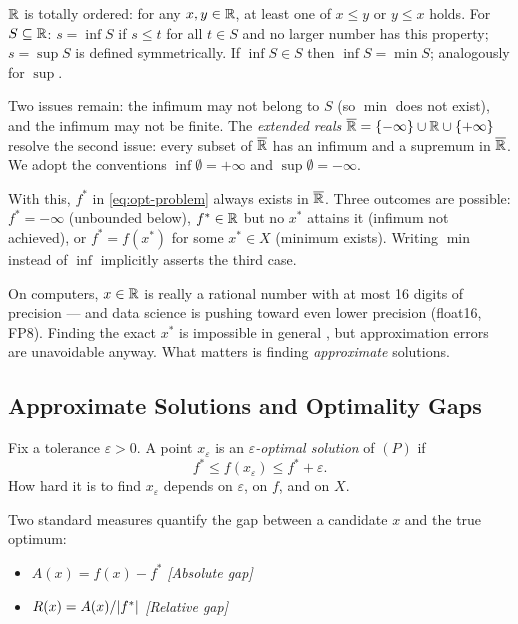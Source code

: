 \begin{defn}\label{def:inf-sup}
	$\mathbb{R}$ is totally ordered: for any $x, y \in \mathbb{R}$, at least one of $x \leq y$ or $y \leq x$ holds.
	For $S \subseteq \mathbb{R}$:
	$s = \inf S$ if $s \leq t$ for all $t \in S$ and no larger number has this property;
	$s = \sup S$ is defined symmetrically.
	If $\inf S \in S$ then $\inf S = \min S$; analogously for $\sup$.
\end{defn}

Two issues remain: the infimum may not belong to $S$ (so $\min$ does not exist), and the infimum may not be finite.
The \textit{extended reals} $\overline{\mathbb{R}} = \{-\infty\} \cup \mathbb{R} \cup \{+\infty\}$ resolve the second issue: every subset of $\overline{\mathbb{R}}$ has an infimum and a supremum in $\overline{\mathbb{R}}$.
We adopt the conventions $\inf \emptyset = +\infty$ and $\sup \emptyset = -\infty$.

With this, $f^*$ in \eqref{eq:opt-problem} always exists in $\overline{\mathbb{R}}$.
Three outcomes are possible: $f^* = -\infty$ (unbounded below), $f^* \in \mathbb{R}$ but no $x^*$ attains it (infimum not achieved), or $f^* = f(x^*)$ for some $x^* \in X$ (minimum exists).
Writing $\min$ instead of $\inf$ implicitly asserts the third case.

On computers, $x \in \mathbb{R}$ is really a rational number with at most 16 digits of precision --- and data science is pushing toward even lower precision (float16, FP8).
Finding the exact $x^*$ is impossible in general \cite{hansen1995}, but approximation errors are unavoidable anyway.
What matters is finding \emph{approximate} solutions.


\subsection{Approximate Solutions and Optimality Gaps}\label{ssec:solution-quality}

\begin{defn}\label{def:approx-solution}
	Fix a tolerance $\varepsilon > 0$.
	A point $x_\varepsilon$ is an \textit{$\varepsilon$-optimal solution} of $(P)$ if
	\begin{equation}\label{eq:eps-optimal}
		f^* \leq f(x_\varepsilon) \leq f^* + \varepsilon.
	\end{equation}
	How hard it is to find $x_\varepsilon$ depends on $\varepsilon$, on $f$, and on $X$.
\end{defn}

Two standard measures quantify the gap between a candidate $x$ and the true optimum:
\begin{itemize}
	\item $A(x) = f(x) - f^*$
		\hfill\textit{[Absolute gap]}
	\item $R(x) = A(x) / \lvert f^*\rvert$
		\hfill\textit{[Relative gap]}
\end{itemize}

